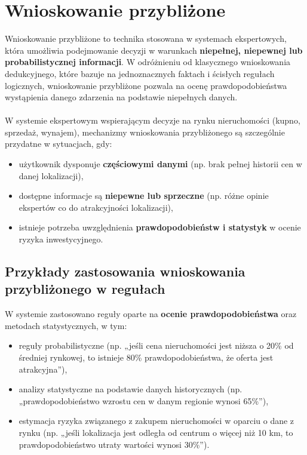 \section{Wnioskowanie przybliżone}

Wnioskowanie przybliżone to technika stosowana w systemach ekspertowych, która umożliwia podejmowanie decyzji w warunkach \textbf{niepełnej, niepewnej lub probabilistycznej informacji}. W odróżnieniu od klasycznego wnioskowania dedukcyjnego, które bazuje na jednoznacznych faktach i ścisłych regułach logicznych, wnioskowanie przybliżone pozwala na ocenę prawdopodobieństwa wystąpienia danego zdarzenia na podstawie niepełnych danych.
\\ \\
W systemie ekspertowym wspierającym decyzje na rynku nieruchomości (kupno, sprzedaż, wynajem), mechanizmy wnioskowania przybliżonego są szczególnie przydatne w sytuacjach, gdy:
\begin{itemize}
    \item użytkownik dysponuje \textbf{częściowymi danymi} (np. brak pełnej historii cen w danej lokalizacji),
    \item dostępne informacje są \textbf{niepewne lub sprzeczne} (np. różne opinie ekspertów co do atrakcyjności lokalizacji),
    \item istnieje potrzeba uwzględnienia \textbf{prawdopodobieństw i statystyk} w ocenie ryzyka inwestycyjnego.
\end{itemize}

\subsection*{Przykłady zastosowania wnioskowania przybliżonego w regułach}

W systemie zastosowano reguły oparte na \textbf{ocenie prawdopodobieństwa} oraz metodach statystycznych, w tym:
\begin{itemize}
    \item reguły probabilistyczne (np. „jeśli cena nieruchomości jest niższa o 20\% od średniej rynkowej, to istnieje 80\% prawdopodobieństwa, że oferta jest atrakcyjna”),
    \item analizy statystyczne na podstawie danych historycznych (np. „prawdopodobieństwo wzrostu cen w danym regionie wynosi 65\%”),
    \item estymacja ryzyka związanego z zakupem nieruchomości w oparciu o dane z rynku (np. „jeśli lokalizacja jest odległa od centrum o więcej niż 10 km, to prawdopodobieństwo utraty wartości wynosi 30\%”).
\end{itemize}

